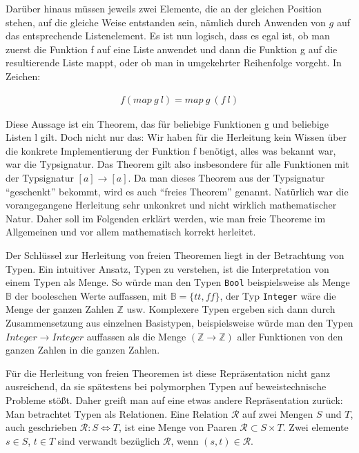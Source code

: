 \documentclass[11pt]{article} %
\begin{document}
Darüber hinaus müssen jeweils zwei Elemente, die an der gleichen Position stehen, auf die gleiche Weise entstanden sein, nämlich
durch Anwenden von $g$ auf das entsprechende Listenelement.
Es ist nun logisch, dass es egal ist, ob man zuerst die Funktion f auf eine Liste anwendet und dann die Funktion g auf die
resultierende Liste mappt, oder ob man in umgekehrter Reihenfolge vorgeht. In Zeichen:

\begin{align}
f (map\ g\ l) = map\ g\ (f\ l)
\end{align}

Diese Aussage ist ein Theorem, das für beliebige Funktionen g und beliebige Listen l gilt. Doch nicht nur das: Wir haben für
die Herleitung kein Wissen über die konkrete Implementierung der Funktion f benötigt, alles was bekannt war, war die Typsignatur.
Das Theorem gilt also insbesondere für alle Funktionen mit der Typsignatur $[a] \rightarrow [a]$. Da man dieses Theorem
aus der Typsignatur ``geschenkt'' bekommt, wird es auch ``freies Theorem'' genannt.
Natürlich war die vorangegangene Herleitung sehr unkonkret und nicht wirklich mathematischer Natur. Daher soll im Folgenden
erklärt werden, wie man freie Theoreme im Allgemeinen und vor allem mathematisch korrekt herleitet.

Der Schlüssel zur Herleitung von freien Theoremen liegt in der Betrachtung von Typen. Ein intuitiver Ansatz, Typen zu verstehen,
ist die Interpretation von einem Typen als Menge. So würde man den Typen \texttt{Bool} beispielsweise als Menge $\mathbb{B}$
der booleschen Werte auffassen, mit $\mathbb{B} = \{ tt, ff \}$, der Typ \texttt{Integer} wäre die Menge der ganzen Zahlen
$\mathbb{Z}$ usw. Komplexere Typen ergeben sich dann durch Zusammensetzung aus einzelnen Basistypen, beispielsweise
würde man den Typen \texttt{$Integer \rightarrow Integer$} auffassen als die Menge $(\mathbb{Z} \rightarrow \mathbb{Z})$ aller Funktionen von den ganzen Zahlen in die ganzen Zahlen.

Für die Herleitung von freien Theoremen ist diese Repräsentation nicht ganz ausreichend, da sie spätestens bei polymorphen
Typen auf beweistechnische Probleme stößt. Daher greift man auf eine etwas andere Repräsentation zurück: Man betrachtet
Typen als Relationen. Eine Relation $\mathcal{R}$ auf zwei Mengen $S$ und $T$, auch geschrieben $\mathcal{R} : S \Leftrightarrow T$, ist eine Menge von Paaren $\mathcal{R} \subset S \times T$. Zwei elemente $s \in S$, $t \in T$ sind verwandt bezüglich
$\mathcal{R}$, wenn $(s, t) \in \mathcal{R}$.
\end{document}
